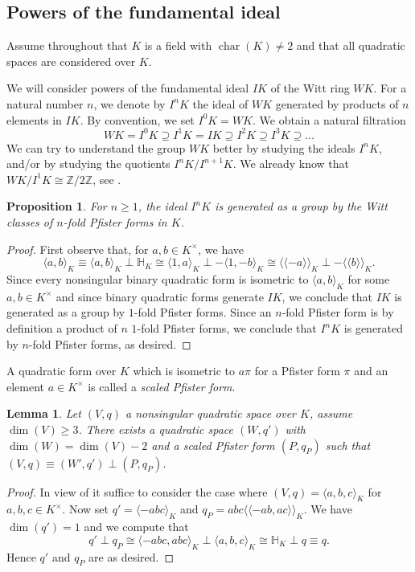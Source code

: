 \documentclass[12pt, leqno, british]{amsart}
\theoremstyle{definition}
\theoremstyle{plain}
\newtheorem{prop}[defi]{Proposition}
\newtheorem{lem}[defi]{Lemma}
\theoremstyle{remark}
\newcommand{\mbb}{\mathbb}
\newcommand{\zz}{\mbb Z}
\DeclareMathOperator{\charac}{char}
\newcommand{\llangle}{\langle\!\langle}
\newcommand{\rrangle}{\rangle\!\rangle}
\begin{document}
\subsection{Powers of the fundamental ideal}
Assume throughout that $K$ is a field with $\charac(K) \neq 2$ and that all quadratic spaces are considered over $K$.

We will consider powers of the fundamental ideal $IK$ of the Witt ring $WK$. For a natural number $n$, we denote by $I^n K$ the ideal of $WK$ generated by products of $n$ elements in $IK$.
By convention, we set $I^0K = WK$.
We obtain a natural filtration
$$ WK = I^0K \supseteq I^1 K = IK \supseteq I^2 K \supseteq I^3 K \supseteq \ldots $$
We can try to understand the group $WK$ better by studying the ideals $I^n K$, and/or by studying the quotients $I^n K / I^{n+1} K$.
We already know that $WK/I^1K \cong \zz / 2\zz$, see .
\begin{prop}\label{P:generators-InK}
For $n \geq 1$, the ideal $I^n K$ is generated as a group by the Witt classes of $n$-fold Pfister forms in $K$.
\end{prop}
\begin{proof}
First observe that, for $a, b \in K^\times$, we have
$$ \langle a, b \rangle_K \equiv \langle a, b \rangle_K \perp \mbb{H}_K \cong \langle 1, a \rangle_K \perp -\langle 1, -b \rangle_K \cong \llangle -a \rrangle_K \perp -\llangle b \rrangle_K.$$
Since every nonsingular binary quadratic form is isometric to $\langle a, b \rangle_K$ for some $a, b \in K^\times$ and since binary quadratic forms generate $IK$, we conclude that $IK$ is generated as a group by $1$-fold Pfister forms.
Since an $n$-fold Pfister form is by definition a product of $n$ $1$-fold Pfister forms, we conclude that $I^n K$ is generated by $n$-fold Pfister forms, as desired.
\end{proof}
A quadratic form over $K$ which is isometric to $a\pi$ for a Pfister form $\pi$ and an element $a \in K^\times$ is called a \emph{scaled Pfister form}.
\begin{lem}\label{L:split-off-2fold-Pfister}
Let $(V, q)$ a nonsingular quadratic space over $K$, assume $\dim(V) \geq 3$.
There exists a quadratic space $(W, q')$ with $\dim(W) = \dim(V) - 2$ and a scaled Pfister form $(P, q_P)$ such that $(V, q) \equiv (W', q') \perp (P, q_P)$.
\end{lem}
\begin{proof}
In view of  it suffice to consider the case where $(V, q) = \langle a, b, c \rangle_K$ for $a, b, c \in K^\times$.
Now set $q' = \langle -abc \rangle_K$ and $q_P = abc\llangle -ab, ac \rrangle_K$.
We have $\dim(q') = 1$ and we compute that
$$q' \perp q_P \cong \langle -abc , abc \rangle_K \perp \langle a, b, c \rangle_K \cong \mbb{H}_K \perp q \equiv q.$$
Hence $q'$ and $q_P$ are as desired.
\end{proof}
\end{document}
